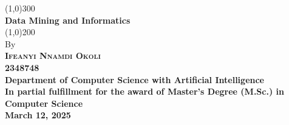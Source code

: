 	\begin{titlepage}
	\begin{center}
		\line(1,0){300}\\
		[0.25in]
		\huge{\bfseries Data Mining and Informatics}\\
		[2mm]
		\line(1,0){200}\\
		[1.0cm]
		By \\
		[1.0cm]
		\textsc{\LARGE \bfseries Ifeanyi Nnamdi Okoli}\\
		\textsc{\LARGE \bfseries 2348748}\\
		[2cm]
		\bfseries Department of Computer Science with Artificial Intelligence\\
		In partial fulfillment for the award of Master's Degree (M.Sc.) in Computer Science \\
		[1in]
		March 12, 2025\\
		[2mm]

	\end{center}
\end{titlepage}